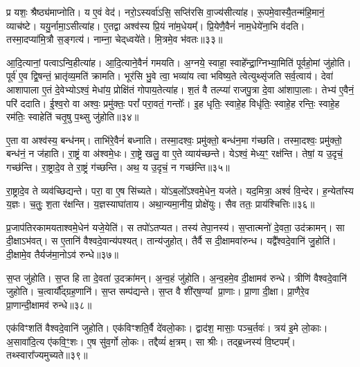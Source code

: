 प्र यशः॒ श्रैष्ठ्य॑माप्नोति।
य ए॒वं वेद॑।
नरो॒ऽस्यर्वा॑ऽसि॒ सप्ति॑रसि वा॒ज्य॑सीत्या॑ह।
रू॒पमे॒वास्यै॒तन्म॑हि॒मानं॒ व्याच॑ष्टे।
ययु॒र्नामा॒\-ऽसीत्या॑ह।
ए॒तद्वा अश्व॑स्य प्रि॒यं ना॑म॒धेयम्᳚।
प्रि॒येणै॒वैनं॑ नाम॒धेये॑ना॒भि व॑दति।
तस्मा॒दप्या॑मि॒त्रौ स॒ङ्गत्य॑।
नाम्ना॒ चेद्‌ध्वये॑ते।
मि॒त्रमे॒व भ॑वतः॥३३॥

आ॒दि॒त्यानां॒ पत्वा\-ऽन्वि॒हीत्या॑ह।
आ॒दि॒त्याने॒वैनं॑ गमयति।
अ॒ग्नये॒ स्वाहा॒ स्वाहे᳚न्द्रा॒ग्निभ्या॒मिति॑ पूर्वहो॒मां जु॑होति।
पूर्व॑ ए॒व द्वि॒षन्तं॒ भ्रातृ॑व्य॒मति॑ क्रामति।
भूर॑सि भु॒वे त्वा॒ भव्या॑य त्वा भविष्य॒ते त्वेत्युथ्सृ॑जति सर्व॒त्वाय॑।
देवा॑ आशापाला ए॒तं दे॒वेभ्यो\-ऽश्वं॒ मेधा॑य॒ प्रोक्षि॑तं गोपाय॒तेत्या॑ह।
श॒तं वै तल्प्या॑ राजपु॒त्रा दे॒वा आ॑शापा॒लाः।
तेभ्य॑ ए॒वैनं॒ परि॑ ददाति।
ई॒श्व॒रो वा अश्वः॒ प्रमु॑क्तः॒ परां᳚ परा॒वतं॒ गन्तोः᳚।
इ॒ह धृतिः॒ स्वाहे॒ह विधृ॑तिः॒ स्वाहे॒ह रन्तिः॒ स्वाहे॒ह रम॑तिः॒ स्वाहेति॑ चतृ॒षु प॒थ्सु जु॑होति॥३४॥

ए॒ता वा अश्व॑स्य॒ बन्ध॑नम्।
ताभि॑रे॒वैनं॑ बध्नाति।
तस्मा॒दश्वः॒ प्रमु॑क्तो॒ बन्ध॑न॒मा ग॑च्छति।
तस्मा॒दश्वः॒ प्रमु॑क्तो॒ बन्ध॑नं॒ न ज॑हाति।
रा॒ष्ट्रं वा अ॑श्वमे॒धः।
रा॒ष्ट्रे खलु॒ वा ए॒ते व्याय॑च्छन्ते।
येऽश्वं॒ मेध्य॒ꣳ॒ रक्ष॑न्ति।
तेषां॒ य उ॒दृचं॒ गच्छ॑न्ति।
रा॒ष्ट्रादे॒व ते रा॒ष्ट्रं ग॑च्छन्ति।
अथ॒ य उ॒दृचं॒ न गच्छ॑न्ति॥३५॥

रा॒ष्ट्रादे॒व ते व्यव॑च्छिद्यन्ते।
परा॒ वा ए॒ष सि॑च्यते।
यो॑ऽब॒लो᳚\-ऽश्वमे॒धेन॒ यज॑ते।
यद॒मित्रा॒ अश्वं॑ वि॒न्देर\sn{}।
ह॒न्येता᳚स्य य॒ज्ञः।
च॒तुः॒ श॒ता र॑क्षन्ति।
य॒ज्ञस्याघा॑ताय।
अथा॒न्यमा॒नीय॒ प्रोक्षे॑युः।
सैव ततः॒ प्राय॑श्चित्तिः॥३६॥\anuvakamend[ग॒च्छ॒ति॒ भ॒व॒तः॒ प॒थ्सु जु॑होति॒ न गच्छ॑न्ति॒ नव॑ च]

प्र॒जाप॑तिरकामयताश्वमे॒धेन॑ यजे॒येति॑।
स तपो॑\-ऽतप्यत।
तस्य॑ तेपा॒नस्य॑।
स॒प्तात्मनो॑ दे॒वता॒ उद॑क्रामन्।
सा दी॒क्षा\-ऽभ॑वत्।
स ए॒तानि॑ वैश्वदे॒वान्य॑पश्यत्।
तान्य॑जुहोत्।
तैर्वै स दी॒क्षामवा॑रुन्ध।
यद्वै᳚श्वदे॒वानि॑ जु॒होति॑।
दी॒क्षामे॒व तैर्यज॑मा॒नोऽव॑ रुन्धे॥३७॥

स॒प्त जु॑होति।
स॒प्त हि ता दे॒वता॑ उ॒दक्रा॑मन्।
अ॒न्व॒हं जु॑होति।
अ॒न्व॒हमे॒व दी॒क्षामव॑ रुन्धे।
त्रीणि॑ वैश्वदे॒वानि॑ जुहोति।
च॒त्वार्यौ᳚द्ग्रह॒णानि॑।
स॒प्त सम्प॑द्यन्ते।
स॒प्त वै शी॑र्‌\mbox{}ष॒ण्या᳚ प्रा॒णाः।
प्रा॒णा दी॒क्षा।
प्रा॒णैरे॒व प्रा॒णान्दी॒क्षामव॑ रुन्धे॥३८॥

एक॑विꣳशतिं वैश्वदे॒वानि॑ जुहोति।
एक॑विꣳशति॒र्वै दे॑वलो॒काः।
द्वाद॑श॒ मासाः॒ पञ्च॒र्तवः॑।
त्रय॑ इ॒मे लो॒काः।
अ॒सावा॑दि॒त्य ए॑कवि॒ꣳ॒शः।
ए॒ष सु॑व॒र्गो लो॒कः।
तद्दैव्यं॑ क्ष॒त्रम्।
सा श्रीः।
तद्ब्र॒ध्नस्य॑ वि॒ष्टपम्᳚।
तथ्स्वारा᳚ज्यमुच्यते॥३९॥

